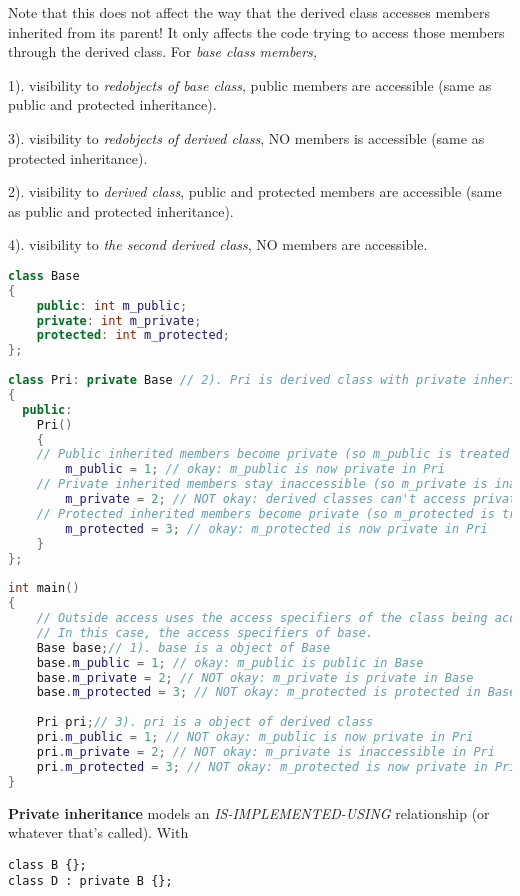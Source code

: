 \documentclass{book}
\begin{document}
Note that this does not affect the way that the derived class accesses members inherited from its parent! It only affects the code trying to access those members through the derived class.
For \textit{base class members,}

1). visibility to \textit{\textit{red}{objects} of base class}, public members are accessible (same as public and protected inheritance). 

3). visibility to \textit{\textit{red}{objects} of derived class}, NO members is accessible (same as protected inheritance).

2). visibility to \textit{derived class}, public and protected members are accessible (same as public and protected inheritance).

4). visibility to \textit{the second derived class}, NO members are accessible.
\begin{lstlisting}[caption={Private inheritance exmaple }, language=C++]
class Base
{
    public: int m_public;
    private: int m_private;
    protected: int m_protected;
};
 
class Pri: private Base // 2). Pri is derived class with private inheritance
{
  public:
    Pri()
    {
    // Public inherited members become private (so m_public is treated as private)
        m_public = 1; // okay: m_public is now private in Pri
    // Private inherited members stay inaccessible (so m_private is inaccessible)
        m_private = 2; // NOT okay: derived classes can't access private members in the base class
    // Protected inherited members become private (so m_protected is treated as private)
        m_protected = 3; // okay: m_protected is now private in Pri
    }
};
 
int main()
{
    // Outside access uses the access specifiers of the class being accessed.
    // In this case, the access specifiers of base.
    Base base;// 1). base is a object of Base
    base.m_public = 1; // okay: m_public is public in Base
    base.m_private = 2; // NOT okay: m_private is private in Base
    base.m_protected = 3; // NOT okay: m_protected is protected in Base
 
    Pri pri;// 3). pri is a object of derived class
    pri.m_public = 1; // NOT okay: m_public is now private in Pri
    pri.m_private = 2; // NOT okay: m_private is inaccessible in Pri
    pri.m_protected = 3; // NOT okay: m_protected is now private in Pri
}
\end{lstlisting}
\textbf{Private inheritance} models an \textit{IS-IMPLEMENTED-USING} relationship (or whatever that's called). With
\begin{verbatim}
class B {};
class D : private B {};
\end{verbatim}
\end{document}
